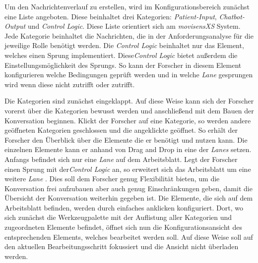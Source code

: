 Um den Nachrichtenverlauf zu erstellen, wird im Konfigurationsbereich zunächst eine Liste angeboten. Diese beinhaltet drei Kategorien: \emph{Patient-Input}, \emph{Chatbot-Output} und \emph{Control Logic}. Diese Liste orientiert sich am \emph{movisensXS} System. Jede Kategorie beinhaltet die Nachrichten, die in der Anforderungsanalyse für die jeweilige Rolle benötigt werden. Die \emph{Control Logic} beinhaltet nur das Element, welches einen Sprung implementiert. Diese\emph{Control Logic} bietet außerdem die Einstellungsmöglichkeit des Sprungs. So kann der Forscher in diesem Element konfigurieren welche Bedingungen geprüft werden und in welche \emph{Lane} gesprungen wird wenn diese nicht zutrifft oder zutrifft. 

Die Kategorien sind zunächst eingeklappt. Auf diese Weise kann sich der Forscher vorerst über die Kategorien bewusst werden und anschließend mit dem Bauen der Konversation beginnen. Klickt der Forscher auf eine Kategorie, so werden andere geöffneten Kategorien geschlossen und die angeklickte geöffnet. So erhält der Forscher den Überblick über die Elemente die er benötigt und nutzen kann. Die einzelnen Elemente kann er anhand von Drag and Drop in eine der \emph{Lanes} setzen. Anfangs befindet sich nur eine \emph{Lane} auf dem Arbeitsblatt. Legt der Forscher einen Sprung mit der\emph{Control Logic} an, so erweitert sich das Arbeitsblatt um eine weitere \emph{Lane} . Dies soll dem Forscher genug Flexibilität bieten, um die Konversation frei aufzubauen aber auch genug Einschränkungen geben, damit die Übersicht der Konversation weiterhin gegeben ist. Die Elemente, die sich auf dem Arbeitsblatt befinden, werden durch einfaches anklicken konfiguriert. Dort, wo sich zunächst die Werkzeugpalette mit der Auflistung aller Kategorien und zugeordneten Elemente befindet, öffnet sich nun die Konfigurationsansicht des entsprechenden Elements, welches bearbeitet werden soll. Auf diese Weise soll auf den aktuellen Bearbeitungsschritt fokussiert und die Ansicht nicht überladen werden. 

